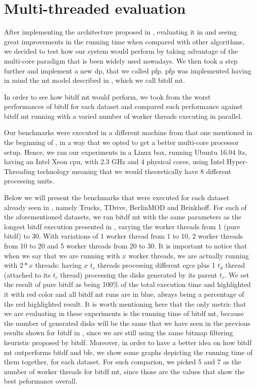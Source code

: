 {%
\section{Multi-threaded evaluation}
After implementing the architecture proposed in , evaluating it in  and
seeing great improvements in the running time when compared with other algorithms, we decided to test how our system
would perform by taking advantage of the multi-core paradigm that is been widely used nowadays. We then took a step
further and implement a new \ac{dp}, that we called \ac{pfp}. \ac{pfp} was implemented having in mind the \ac{mt} model
described in , which we call \ac{bitdf} \ac{mt}.

In order to see how \ac{bitdf} \ac{mt} would perform, we took from  the worst performances of
\ac{bitdf} for each dataset and compared such performance against \ac{bitdf} \ac{mt} running with a varied number of
worker threads executing in parallel.

Our benchmarks were executed in a different machine from that one mentioned in the beginning of ,
in a way that we opted to get a better multi-core processor setup. Hence, we ran our experiments in a Linux box, running
Ubuntu 16.04 \ac{lts}, having an Intel Xeon \ac{cpu}, with 2.3 GHz and 4 physical cores, using Intel Hyper-Threading
technology \citep{hyper} meaning that we would theoretically have 8 different processing units.

Below we will present the benchmarks that were executed for each dataset already seen in , namely
Trucks, TDrive, BerlinMOD and Brinkhoff. For each of the aforementioned datasets, we ran \ac{bitdf} \ac{mt} with the
same parameters as the longest \ac{bitdf} execution presented in , varying the worker threads from
1 (pure \ac{bitdf}) to 30. With variations of 1 worker thread from 1 to 10, 2 worker threads from 10 to 20 and 5 worker
threads from 20 to 30. It is important to notice that when we say that we are running with $x$ worker threads, we are
actually running with $2*x$ threads: having $x$ $t_c$ threads processing different \acp{egc} plus 1 $t_d$ thread
(attached to its $t_c$ thread) processing the disks generated by its parent $t_c$. We set the result of pure \ac{bitdf}
as being 100\% of the total execution time and highlighted it with red color and all \ac{bitdf} \ac{mt} runs are in
blue, always being a percentage of the red highlighted result. It is worth mentioning here that the only metric that we
are evaluating in these experiments is the running time of \ac{bitdf} \ac{mt}, because the number of generated disks
will be the same that we have seen in the previous results shown for \ac{bitdf} in , since we are
still using the same bitmap filtering heuristic proposed by \ac{bitdf}. Moreover, in order to have a better idea on how
\ac{bitdf} \ac{mt} outperforms \ac{bitdf} and \ac{bfe}, we show some graphs depicting the running time of them together,
for each dataset.  For such comparion, we picked 5 and 7 as the number of worker threads for \ac{bitdf} \ac{mt}, since
those are the values that show the best peformance overall.

}
